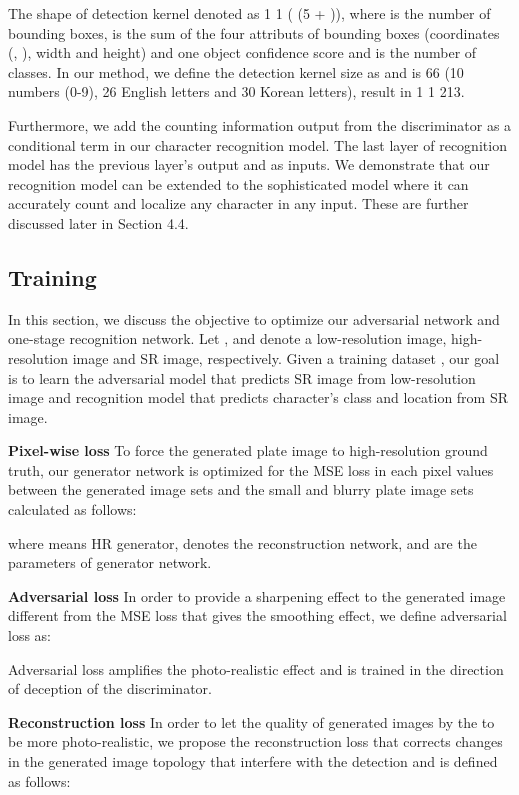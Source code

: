 \documentclass[a4paper,twoside]{article}
\begin{document}
     The shape of detection kernel denoted as 1  1  (  (5 + )), where  is the number of bounding boxes,  is the sum of the four attributs of bounding boxes (coordinates (, ), width and height) and one object confidence score and  is the number of classes. In our method, we define the detection kernel size as  and  is 66 (10 numbers (0-9), 26 English letters and 30 Korean letters), result in 1  1  213.  
     
     Furthermore, we add the counting information output  from the discriminator as a conditional term in our character recognition model. The last layer of recognition model has the previous layer's output and  as inputs. We demonstrate that our recognition model can be extended to the sophisticated model where it can accurately count and localize any character in any input. These are further discussed later in Section 4.4.
    
\subsection{Training}
    In this section, we discuss the objective to optimize our adversarial network and one-stage recognition network. Let ,  and  denote a low-resolution image, high-resolution image and SR image, respectively. Given a training dataset , our goal is to learn the adversarial model that predicts SR image from low-resolution image and recognition model that predicts character's class and location from SR image.
    
    \textbf{Pixel-wise loss} To force the generated plate image to high-resolution ground truth, our generator network is optimized for the MSE loss in each pixel values between the generated image sets and the small and blurry plate image sets calculated as follows:

    where  means HR generator,  denotes the reconstruction network, and  are the parameters of generator network.
    
    \textbf{Adversarial loss} In order to provide a sharpening effect to the generated image different from the MSE loss that gives the smoothing effect, we define adversarial loss as:

    Adversarial loss amplifies the photo-realistic effect and is trained in the direction of deception of the discriminator.
    
    \textbf{Reconstruction loss} In order to let the quality of generated images by the  to be more photo-realistic, we propose the reconstruction loss that corrects changes in the generated image topology that interfere with the detection and is defined as follows:
\end{document}
